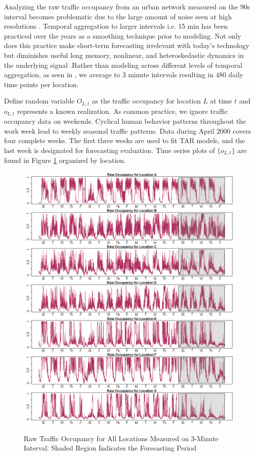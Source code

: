 Analyzing the raw traffic occupancy from an urban network measured on the 90s interval becomes problematic due to the large amount of noise seen at high resolutions \citep{Vlahogianni2014}. Temporal aggregation to larger intervals i.e. 15 min has been practiced over the years as a smoothing technique prior to modeling. Not only does this practice make short-term forecasting irrelevant with today's technology but diminishes useful long memory, nonlinear, and heteroskedastic dynamics in the underlying signal \cite{Vlahogianni2011}.Rather than modeling across different levels of temporal aggregation, as seen in \cite{Shang2006}, we average to 3 minute intervals resulting in 480 daily time points per location. 

Define random variable $O_{L,t}$ as the traffic occupancy for location $L$ at time $t$ and $o_{L,t}$ represents a known realization. As common practice, we ignore traffic occupancy data on weekends. Cyclical human behavior patterns throughout the work week lead to weekly seasonal traffic patterns. Data during April 2000 covers four complete weeks. The first three weeks are used to fit TAR models, and the last week is designated for forecasting evaluation. Time series plots of $\{o_{L,t}\}$ are found in Figure \ref{fig:OrigPlotTrafficOcc} organized by location.

\begin{figure}[htbp]
\caption{Raw Traffic Occupancy for All Locations Measured on 3-Minute Interval: Shaded Region Indicates the Forecasting Period}
\includegraphics[width=\textwidth]{rawplots}
\label{fig:OrigPlotTrafficOcc}
\end{figure}








